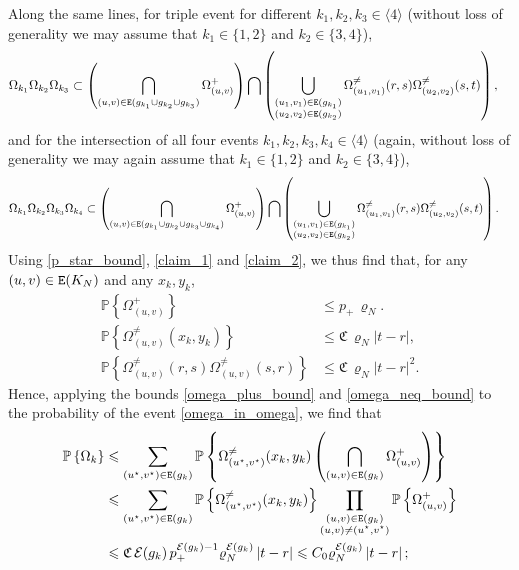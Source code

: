 \documentclass[11pt,reqno]{amsart}
\numberwithin{equation}{section}
\newcommand{\abs}[1]{\left\lvert #1 \right\rvert}
\newcommand{\sprod}[1]{\langle#1\rangle}
\newcommand{\pk}[1]{\mathbb{P} \left\{ #1 \right \} }
\begin{document}
Along the same lines, for triple event for different $k_1,k_2,k_3\in\sprod{4}$ (without loss of generality we may assume that $k_1\in\{1,2\}$ and $k_2\in\{3,4\}$),
\begin{align}
    \Omega_{k_1}\Omega_{k_2}\Omega_{k_3} &\subset \left(\bigcap_{(u,v)\in{\tt E}(g_{k_1}\cup g_{k_2}\cup g_{k_3})}\Omega^{+}_{{(u,v)}}\right){\bigcap}\left(\bigcup_{\substack{(u_1,v_1)\in{\tt E}(g_{k_1}) \\ (u_2,v_2)\in{\tt E}(g_{k_2})}}\Omega^{\not =}_{(u_1,v_1)}(r,s)\Omega^{\not =}_{(u_2,v_2)}(s,t)\right)\label{omega_triple_bound},
\end{align}
and for the intersection of all four events $k_1,k_2,k_3,k_4\in\sprod{4}$ (again, without loss of generality we may again assume that $k_1\in\{1,2\}$ and $k_2\in\{3,4\}$),
\begin{align}
    \Omega_{k_1}\Omega_{k_2}\Omega_{k_3}\Omega_{k_4} &\subset \left(\bigcap_{(u,v)\in{\tt E}(g_{k_1}\cup g_{k_2}\cup g_{k_3}\cup g_{k_4})}\Omega^{+}_{{(u,v)}}\right){\bigcap}\left(\bigcup_{\substack{(u_1,v_1)\in{\tt E}(g_{k_1}) \\ (u_2,v_2)\in{\tt E}(g_{k_2})}}\Omega^{\not =}_{(u_1,v_1)}(r,s)\Omega^{\not =}_{(u_2,v_2)}(s,t)\right)\label{omega_quad_bound}.
\end{align}
Using \eqref{p_star_bound}, \eqref{claim_1} and \eqref{claim_2}, we thus find that, for any $(u,v)\in{\tt E}(K_N)$ and any $x_k,y_k$,
\begin{align}
    \pk{\Omega^{+}_{(u,v)}}&\leqslant {p_+}\,\varrho_N.\label{omega_plus_bound}\\
    \pk{ \Omega_{(u,v)}^{\not =}(x_k,y_k)}&\leqslant {\mathfrak{C}}\,\varrho_N\abs{t-r}\label{omega_neq_bound},\\
    \pk{ \Omega_{(u,v)}^{\not =}(r,s)\Omega_{(u,v)}^{\not =}(s,r)}&\leqslant {\mathfrak{C}}\,\varrho_N\abs{t-r}^2.\label{omega_two_bound}
\end{align}
Hence, applying the bounds \eqref{omega_plus_bound} and \eqref{omega_neq_bound} to the probability of the event \eqref{omega_in_omega}, we find that
\begin{align*}
    \pk{\Omega_k}&\leqslant \sum_{{(u^{\star},v^{\star})\in{\tt E}(g_k)}}\pk{\Omega^{\not =}_{(u^{\star},v^{\star})}(x_k,y_k)\left(\bigcap_{(u,v)\in{\tt E}(g_k)}\Omega^{+}_{{(u,v)}}\right)}\\
    &\leqslant \sum_{{(u^{\star},v^{\star})\in{\tt E}(g_k)}}\pk{\Omega^{\not =}_{(u^{\star},v^{\star})}(x_k,y_k)}\prod_{\substack{(u,v)\in{\tt E}(g_k) \\ (u,v)\not= (u^{\star},v^{\star})}}\pk{\Omega^{+}_{(u,v)}}\\
    &\leqslant {\mathfrak{C}}\,\mathcal{E}(g_k)\,{p_+^{\mathcal{E}(g_k)-1}}\varrho_N^{\mathcal{E}(g_k)}\abs{t-r}\leqslant C_0\varrho_N^{\mathcal{E}(g_k)}\abs{t-r};
\end{align*}
\end{document}
